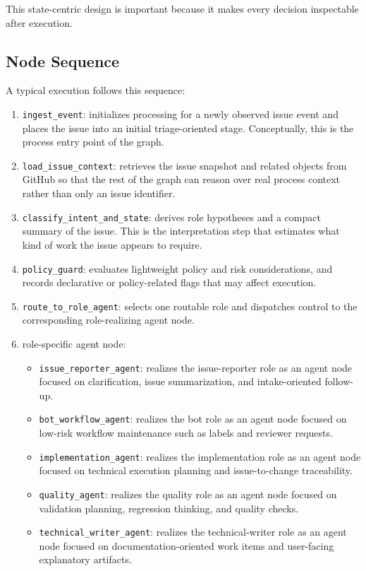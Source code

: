 \documentclass[11pt,a4paper]{article}
\begin{document}
This state-centric design is important because it makes every decision inspectable after execution.

\subsection{Node Sequence}

A typical execution follows this sequence:
\begin{enumerate}
    \item \texttt{ingest\_event}: initializes processing for a newly observed issue event and places the issue into an initial triage-oriented stage. Conceptually, this is the process entry point of the graph.
    \item \texttt{load\_issue\_context}: retrieves the issue snapshot and related objects from GitHub so that the rest of the graph can reason over real process context rather than only an issue identifier.
    \item \texttt{classify\_intent\_and\_state}: derives role hypotheses and a compact summary of the issue. This is the interpretation step that estimates what kind of work the issue appears to require.
    \item \texttt{policy\_guard}: evaluates lightweight policy and risk considerations, and records declarative or policy-related flags that may affect execution.
    \item \texttt{route\_to\_role\_agent}: selects one routable role and dispatches control to the corresponding role-realizing agent node.
    \item role-specific agent node:
    \begin{itemize}
        \item \texttt{issue\_reporter\_agent}: realizes the issue-reporter role as an agent node focused on clarification, issue summarization, and intake-oriented follow-up.
        \item \texttt{bot\_workflow\_agent}: realizes the bot role as an agent node focused on low-risk workflow maintenance such as labels and reviewer requests.
        \item \texttt{implementation\_agent}: realizes the implementation role as an agent node focused on technical execution planning and issue-to-change traceability.
        \item \texttt{quality\_agent}: realizes the quality role as an agent node focused on validation planning, regression thinking, and quality checks.
        \item \texttt{technical\_writer\_agent}: realizes the technical-writer role as an agent node focused on documentation-oriented work items and user-facing explanatory artifacts.

\end{itemize}
\end{enumerate}
\end{document}
